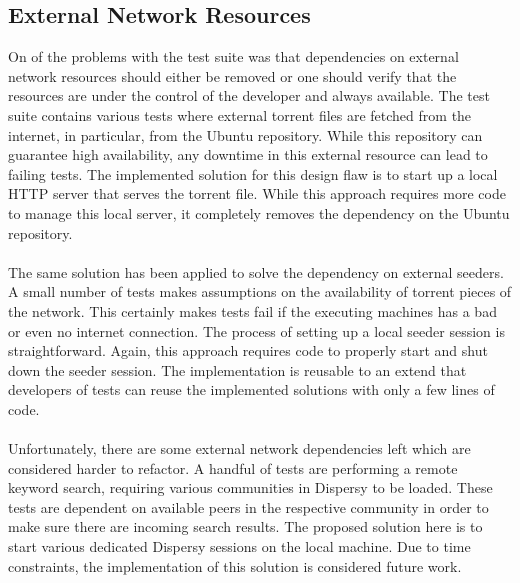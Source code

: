 \subsection{External Network Resources}
On of the problems with the test suite was that dependencies on external network resources should either be removed or one should verify that the resources are under the control of the developer and always available. The test suite contains various tests where external torrent files are fetched from the internet, in particular, from the Ubuntu repository. While this repository can guarantee high availability, any downtime in this external resource can lead to failing tests. The implemented solution for this design flaw is to start up a local HTTP server that serves the torrent file. While this approach requires more code to manage this local server, it completely removes the dependency on the Ubuntu repository.\\\\
The same solution has been applied to solve the dependency on external seeders. A small number of tests makes assumptions on the availability of torrent pieces of the network. This certainly makes tests fail if the executing machines has a bad or even no internet connection. The process of setting up a local seeder session is straightforward. Again, this approach requires code to properly start and shut down the seeder session. The implementation is reusable to an extend that developers of tests can reuse the implemented solutions with only a few lines of code.\\\\
Unfortunately, there are some external network dependencies left which are considered harder to refactor. A handful of tests are performing a remote keyword search, requiring various communities in Dispersy to be loaded. These tests are dependent on available peers in the respective community in order to make sure there are incoming search results. The proposed solution here is to start various dedicated Dispersy sessions on the local machine. Due to time constraints, the implementation of this solution is considered future work.

